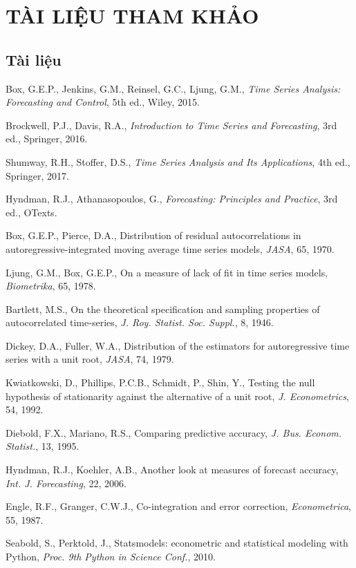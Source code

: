 \clearpage
\section*{TÀI LIỆU THAM KHẢO}

\subsection*{Tài liệu}
\begin{enumerate}[label={[\arabic*]},leftmargin=1.2cm]
\item \hypertarget{tl1}{}Box, G.E.P., Jenkins, G.M., Reinsel, G.C., Ljung, G.M., \textit{Time Series Analysis: Forecasting and Control}, 5th ed., Wiley, 2015.
\item \hypertarget{tl2}{}Brockwell, P.J., Davis, R.A., \textit{Introduction to Time Series and Forecasting}, 3rd ed., Springer, 2016.
\item \hypertarget{tl3}{}Shumway, R.H., Stoffer, D.S., \textit{Time Series Analysis and Its Applications}, 4th ed., Springer, 2017.
\item \hypertarget{tl4}{}Hyndman, R.J., Athanasopoulos, G., \textit{Forecasting: Principles and Practice}, 3rd ed., OTexts.
\item \hypertarget{tl5}{}Box, G.E.P., Pierce, D.A., Distribution of residual autocorrelations in autoregressive-integrated moving average time series models, \textit{JASA}, 65, 1970.
\item \hypertarget{tl6}{}Ljung, G.M., Box, G.E.P., On a measure of lack of fit in time series models, \textit{Biometrika}, 65, 1978.
\item \hypertarget{tl7}{}Bartlett, M.S., On the theoretical specification and sampling properties of autocorrelated time-series, \textit{J. Roy. Statist. Soc. Suppl.}, 8, 1946.
\item \hypertarget{tl8}{}Dickey, D.A., Fuller, W.A., Distribution of the estimators for autoregressive time series with a unit root, \textit{JASA}, 74, 1979.
\item \hypertarget{tl9}{}Kwiatkowski, D., Phillips, P.C.B., Schmidt, P., Shin, Y., Testing the null hypothesis of stationarity against the alternative of a unit root, \textit{J. Econometrics}, 54, 1992.
\item \hypertarget{tl10}{}Diebold, F.X., Mariano, R.S., Comparing predictive accuracy, \textit{J. Bus. Econom. Statist.}, 13, 1995.
\item \hypertarget{tl11}{}Hyndman, R.J., Koehler, A.B., Another look at measures of forecast accuracy, \textit{Int. J. Forecasting}, 22, 2006.
\item \hypertarget{tl12}{}Engle, R.F., Granger, C.W.J., Co-integration and error correction, \textit{Econometrica}, 55, 1987.
\item \hypertarget{tl13}{}Seabold, S., Perktold, J., Statsmodels: econometric and statistical modeling with Python, \textit{Proc. 9th Python in Science Conf.}, 2010.
\end{enumerate}

